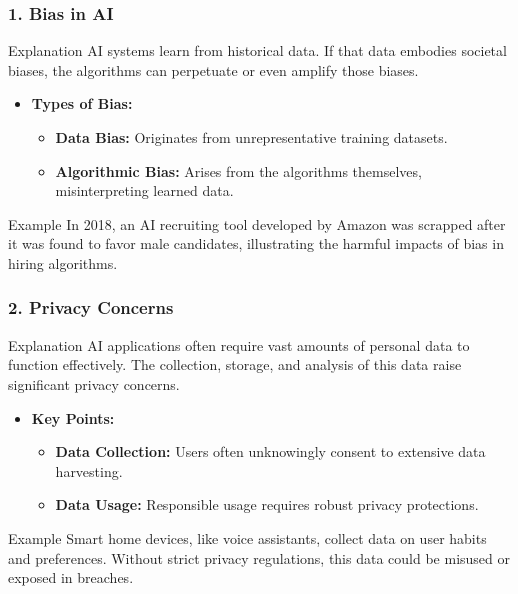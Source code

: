 \documentclass[aspectratio=169]{beamer}
\begin{document}
\begin{frame}[fragile]
    \frametitle{1. Bias in AI}
    
    \begin{block}{Explanation}
        AI systems learn from historical data. If that data embodies societal biases, the algorithms can perpetuate or even amplify those biases.
    \end{block}

    \begin{itemize}
        \item \textbf{Types of Bias:}
            \begin{itemize}
                \item \textbf{Data Bias:} Originates from unrepresentative training datasets.
                \item \textbf{Algorithmic Bias:} Arises from the algorithms themselves, misinterpreting learned data.
            \end{itemize}
    \end{itemize}

    \begin{exampleblock}{Example}
        In 2018, an AI recruiting tool developed by Amazon was scrapped after it was found to favor male candidates, 
        illustrating the harmful impacts of bias in hiring algorithms.
    \end{exampleblock}
\end{frame}

\begin{frame}[fragile]
    \frametitle{2. Privacy Concerns}
    
    \begin{block}{Explanation}
        AI applications often require vast amounts of personal data to function effectively. 
        The collection, storage, and analysis of this data raise significant privacy concerns.
    \end{block}

    \begin{itemize}
        \item \textbf{Key Points:}
            \begin{itemize}
                \item \textbf{Data Collection:} Users often unknowingly consent to extensive data harvesting.
                \item \textbf{Data Usage:} Responsible usage requires robust privacy protections.
            \end{itemize}
    \end{itemize}

    \begin{exampleblock}{Example}
        Smart home devices, like voice assistants, collect data on user habits and preferences. 
        Without strict privacy regulations, this data could be misused or exposed in breaches.
    \end{exampleblock}
\end{frame}
\end{document}
